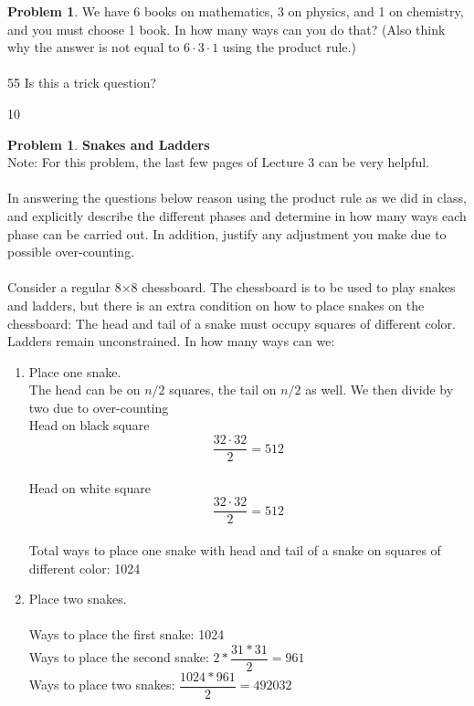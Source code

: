 \documentclass[10pt,leqno ]{article}
\theoremstyle{definition}
\newtheorem{problem}[theorem]{Problem}
\begin{document}
\begin{problem} We have 6 books on mathematics, 3 on physics, and 1 on chemistry, and you must choose 1 book.  In how many ways can you do that?  (Also think why the answer is not equal to $6 \cdot 3 \cdot 1$ using the product rule.)
\\\\55
Is this a trick question?
\begin{center}
10
\end{center}

\end{problem}
\newpage

\begin{problem} \textbf{Snakes and Ladders} \\
Note:  For this problem, the last few pages of Lecture 3 can be very helpful.
\\\\
In answering the questions below  reason using the product rule as we did in class, and explicitly describe the different phases and determine in how many ways each phase can be carried out.  In addition,  justify any adjustment you make due to possible over-counting.
\\\\
Consider  a  regular  8×8  chessboard.   The  chessboard  is  to  be  used  to  play snakes and ladders, but there is an extra condition on how to place snakes on the chessboard:  The head and tail of a snake must occupy squares of different color.  Ladders remain unconstrained.  In how many ways can we:
\begin{enumerate}[label=(\alph*)]
\item Place one snake.
\\
The head can be on $n/2$ squares, the tail on $n/2$ as well.  We then divide by two due to over-counting
\\
Head on black square
$$\dfrac{32 \cdot 32}{2} = 512$$
\\
Head on white square
$$\dfrac{32 \cdot 32}{2} = 512$$
\\
Total ways to place one snake with head and tail of a snake on squares of different color: 1024

\newpage
\item Place two snakes.
\\\\
Ways to place the first snake: 1024
\\
Ways to place the second snake: $2 * \dfrac{31 * 31}{2} = 961$ 
\\
Ways to place two snakes: $\dfrac{1024 * 961}{2} = 492032$  


\end{enumerate}
\end{problem}
\end{document}
